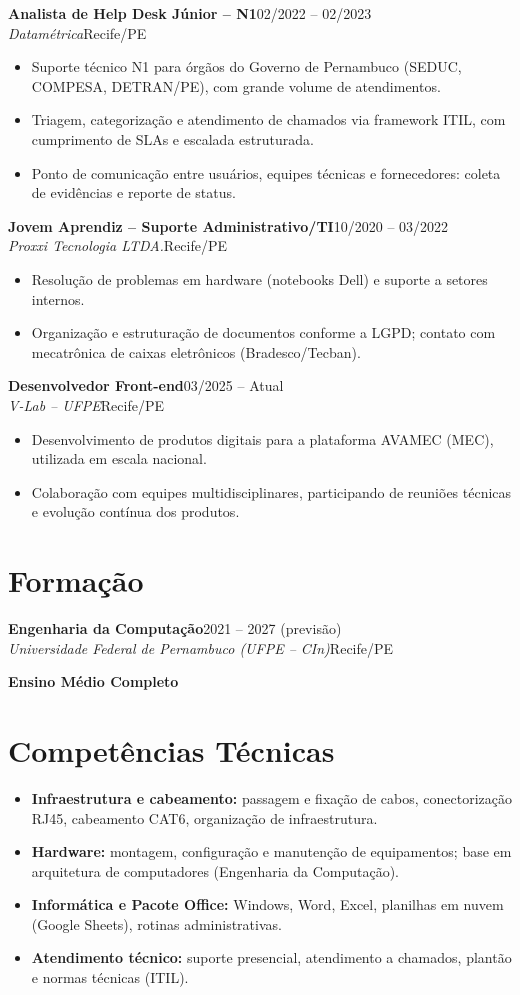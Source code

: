 \documentclass[10pt,a4paper]{article}
\newcommand{\cventry}[4]{%
  \vspace{3pt}%
  {\bfseries #1}\hfill{\color{gray}\small #3}\\
  {\itshape\color{accent} #2}\hfill{\color{gray}\small #4}\par
  \vspace{1pt}%
}
\begin{document}
\cventry{Analista de Help Desk Júnior -- N1}{Datamétrica}{02/2022 -- 02/2023}{Recife/PE}
\begin{itemize}
  \item Suporte técnico N1 para órgãos do Governo de Pernambuco (SEDUC, COMPESA, DETRAN/PE), com grande volume de atendimentos.
  \item Triagem, categorização e atendimento de chamados via framework ITIL, com cumprimento de SLAs e escalada estruturada.
  \item Ponto de comunicação entre usuários, equipes técnicas e fornecedores: coleta de evidências e reporte de status.
\end{itemize}

\cventry{Jovem Aprendiz -- Suporte Administrativo/TI}{Proxxi Tecnologia LTDA.}{10/2020 -- 03/2022}{Recife/PE}
\begin{itemize}
  \item Resolução de problemas em hardware (notebooks Dell) e suporte a setores internos.
  \item Organização e estruturação de documentos conforme a LGPD; contato com mecatrônica de caixas eletrônicos (Bradesco/Tecban).
\end{itemize}

\cventry{Desenvolvedor Front-end}{V-Lab -- UFPE}{03/2025 -- Atual}{Recife/PE}
\begin{itemize}
  \item Desenvolvimento de produtos digitais para a plataforma AVAMEC (MEC), utilizada em escala nacional.
  \item Colaboração com equipes multidisciplinares, participando de reuniões técnicas e evolução contínua dos produtos.
\end{itemize}

\section{Formação}
\cventry{Engenharia da Computação}{Universidade Federal de Pernambuco (UFPE -- CIn)}{2021 -- 2027 (previsão)}{Recife/PE}
\textbf{Ensino Médio Completo}

\section{Competências Técnicas}
\begin{itemize}
  \item \textbf{Infraestrutura e cabeamento:} passagem e fixação de cabos, conectorização RJ45, cabeamento CAT6, organização de infraestrutura.
  \item \textbf{Hardware:} montagem, configuração e manutenção de equipamentos; base em arquitetura de computadores (Engenharia da Computação).
  \item \textbf{Informática e Pacote Office:} Windows, Word, Excel, planilhas em nuvem (Google Sheets), rotinas administrativas.
  \item \textbf{Atendimento técnico:} suporte presencial, atendimento a chamados, plantão e normas técnicas (ITIL).
\end{itemize}
\end{document}
